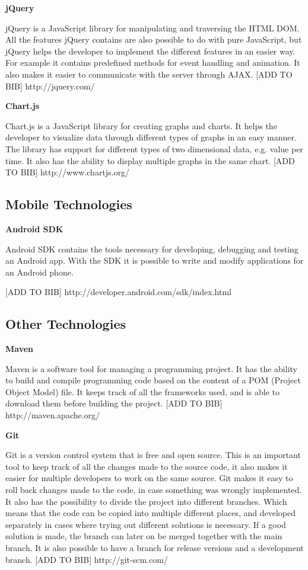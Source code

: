 \textbf{jQuery}

jQuery is a JavaScript library for manipulating and traversing the HTML DOM.
All the features jQuery contains are also possible to do with pure JavaScript, but jQuery helps the developer to implement the different features in an easier way.
For example it contains predefined methods for event handling and animation.
It also makes it easier to communicate with the server through AJAX.
[ADD TO BIB]
http://jquery.com/

\textbf{Chart.js}

Chart.js is a JavaScript library for creating graphs and charts.
It helps the developer to visualize data through different types of graphs in an easy manner.
The library has support for different types of two dimensional data, e.g. value per time.
It also has the ability to display multiple graphs in the same chart.
[ADD TO BIB]
http://www.chartjs.org/

\subsection{Mobile Technologies}

\textbf{Android SDK}

Android SDK contains the tools necessary for developing, debugging and testing an Android app.
With the SDK it is possible to write and modify applications for an Android phone.

[ADD TO BIB]
http://developer.android.com/sdk/index.html

\subsection{Other Technologies}

\textbf{Maven}

Maven is a software tool for managing a programming project.
It has the ability to build and compile programming code based on the content of a POM (Project Object Model) file.
It keeps track of all the frameworks used, and is able to download them before building the project.
[ADD TO BIB]
http://maven.apache.org/

\textbf{Git}

Git is a version control system that is free and open source.
This is an important tool to keep track of all the changes made to the source code, it also makes it easier for multiple developers to work on the same source.
Git makes it easy to roll back changes made to the code, in case something was wrongly implemented.
It also has the possibility to divide the project into different branches.
Which means that the code can be copied into multiple different places, and developed separately in cases where trying out different solutions is necessary.
If a good solution is made, the branch can later on be merged together with the main branch.
It is also possible to have a branch for release versions and a development branch.
[ADD TO BIB]
http://git-scm.com/

